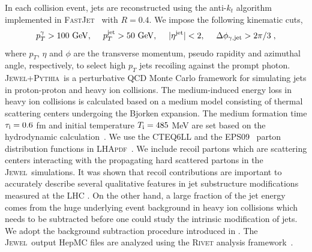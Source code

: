 \documentclass[notoc]{JHEP3}
\newcommand{\text}[1]{{\rm #1}}
\newcommand{\jw}{\textsc{Jewel}}
\newcommand{\jwpy}{\textsc{Jewel+Pythia}}
\begin{document}
In each collision event, jets are reconstructed using the anti-$k_{t}$ algorithm~\cite{Cacciari:2008gp} implemented in \textsc{FastJet}~\cite{Cacciari:2011ma} with $R = 0.4$. We impose the following kinematic cuts,
\begin{equation}
    p^{\gamma}_T > 100~{\rm GeV}, ~~~~ p^{\rm jet}_T > 50~{\rm GeV}, ~~~~ |\eta^{\rm jet}|<2, ~~~~\Delta \phi_{\gamma, {\rm jet}} > 2\pi/3\;,
\end{equation}
where $p_T$, $\eta$ and $\phi$ are the transverse momentum, pseudo rapidity and azimuthal angle, respectively, to select high $p_T$ jets recoiling against the prompt photon. \jwpy ~is a perturbative QCD Monte Carlo framework for simulating jets in proton-proton and heavy ion collisions. The medium-induced energy loss in heavy ion collisions is calculated based on a medium model consisting of thermal scattering centers undergoing the Bjorken expansion. The medium formation time $\tau_\text{i}=0.6 $ fm and initial temperature $T_\text{i}=485$ MeV are set based on the hydrodynamic calculation~\cite{Shen:2012vn,Shen:2014vra}. We use the \textsc{CTEQ6LL} \cite{Pumplin:2002vw} and the \textsc{EPS09}~\cite{Eskola:2009uj} parton distribution functions in \textsc{LHApdf}~\cite{Whalley:2005nh}. We include recoil partons which are scattering centers interacting with the propagating hard scattered partons in the \jw~simulations. It was shown that recoil contributions are important to accurately describe several qualitative features in jet substructure modifications measured at the LHC \cite{KunnawalkamElayavalli:2017hxo,Milhano:2017nzm}. On the other hand, a large fraction of the jet energy comes from the huge underlying event background in heavy ion collisions which needs to be subtracted before one could study the intrinsic modification of jets. We adopt the background subtraction procedure introduced in \cite{KunnawalkamElayavalli:2017hxo}. The \jw ~output HepMC files are analyzed using the \textsc{Rivet} analysis framework~\cite{}.
\end{document}
